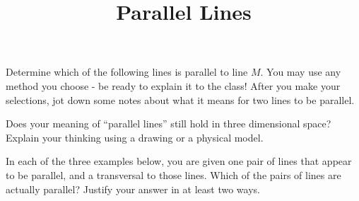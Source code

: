 \documentclass[nooutcomes,noauthor]{ximera}
\title{Parallel Lines}
\begin{document}
\begin{abstract}\end{abstract}
\maketitle




\begin{problem}
Determine which of the following lines is parallel to line $M$.  You may use any method you choose - be ready to explain it to the class!  After you make your selections, jot down some notes about what it means for two lines to be parallel.

\vskip 1.5in

\begin{image}
\end{image}

\end{problem}

\vfill
\begin{problem}
Does your meaning of ``parallel lines'' still hold in three dimensional space? Explain your thinking using a drawing or a physical model.
\end{problem}

\newpage
\begin{problem}

In each of the three examples below, you are given one pair of lines that appear to be parallel, and a transversal to those lines.  Which of the pairs of lines are actually parallel?  Justify your answer in at least two ways.

\begin{image}
\end{image}

\end{problem}
\end{document}
